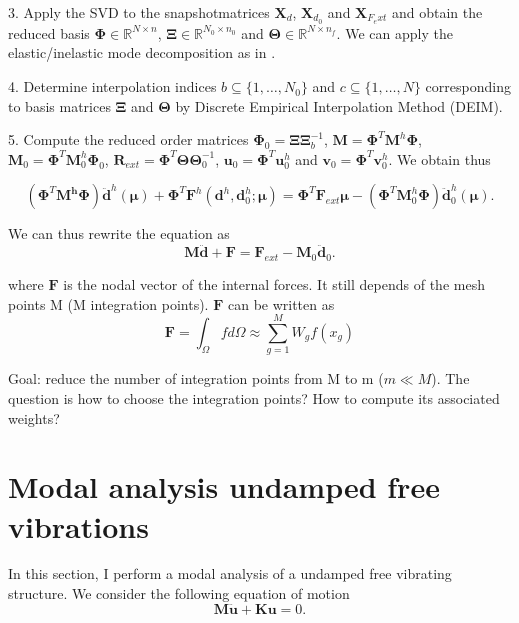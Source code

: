 \documentclass{article}
\begin{document}
3. Apply the SVD to the snapshotmatrices $\bm{X}_d$, $\bm{X}_{d_0}$ and $\bm{X}_{F_ext}$ and obtain the reduced basis $\bm{\Phi} \in \mathbb{R}^{N \times n}$, $\bm{\Xi} \in \mathbb{R}^{N_0 \times n_0}$ and $\bm{\Theta} \in \mathbb{R}^{N \times n_f}$. We can apply the elastic/inelastic mode decomposition as in \cite{hernandez14}.

4. Determine interpolation indices $b \subseteq \{1, \hdots, N_0 \}$ and $c \subseteq \{1, \hdots, N \}$ corresponding to basis matrices $\bm{\Xi}$ and $\bm{\Theta}$ by Discrete Empirical Interpolation Method (DEIM).

5. Compute the reduced order matrices $\bm{\Phi}_0 = \bm{\Xi} \bm{\Xi}_b^{-1}$, $\bm{M} = \bm{\Phi}^T \bm{M}^h\bm{\Phi}$, $\bm{M}_0 = \bm{\Phi}^T \bm{M}_0^h\bm{\Phi}_0$, $\bm{R}_{ext} = \bm{\Phi}^T \bm{\Theta}\bm{\Theta}_0^{-1}$, $\bm{u}_0 = \bm{\Phi}^T \bm{u}_0^h$ and $\bm{v}_0 = \bm{\Phi}^T \bm{v}_0^h$. We obtain thus

\begin{equation}
  (\bm{\Phi}^T \bm{M^h}\bm{\Phi}) \bm{\ddot{d}}^h(\bm{\mu}) + \bm{\Phi}^T \bm{F}^h(\bm{d}^h, \bm{d}_0^h; \bm{\mu}) = \bm{\Phi}^T \bm{F}_{ext} \bm{\mu} - (\bm{\Phi}^T \bm{M}_0^h \bm{\Phi}) \bm{\ddot{d}}_0^h(\bm{\mu}).
\end{equation}

We can thus rewrite the equation as 
\begin{equation}
  \bm{M} \bm{\ddot{d}} + \bm{F} = \bm{F}_{ext} - \bm{M}_0 \bm{\ddot{d}}_0.
\end{equation}

where $\bm{F}$ is the nodal vector of the internal forces. It still depends of the mesh points M (M integration points). $\bm{F}$ can be written as
\begin{equation}
  \bm{F} = \int_\Omega f d\Omega \approx \sum_{g=1}^M W_g f(x_g)
\end{equation}

Goal: reduce the number of integration points from M to m ($m \ll M$). The question is how to choose the integration points? How to compute its associated weights?

\newpage
\section{Modal analysis undamped free vibrations}
In this section, I perform a modal analysis of a undamped free vibrating structure. We consider the following equation of motion
\begin{equation}
  \bm{M}\bm{\ddot{u}} + \bm{K}\bm{u} = 0.
  \label{eq:modal_analysis_motion_equation}
\end{equation}
\end{document}
